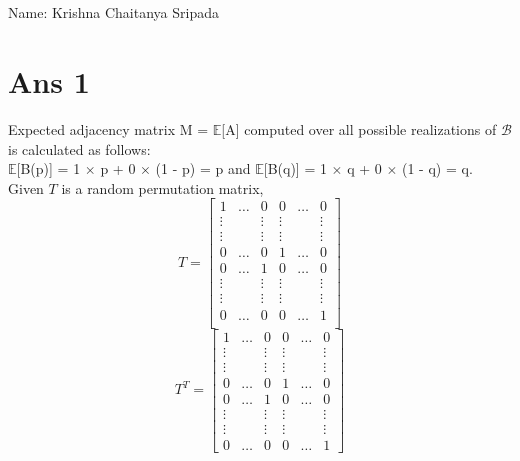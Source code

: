\documentclass[10pt]{article}
\begin{document}
\section*{}
\begin{flushleft}
Name: Krishna Chaitanya Sripada\\
\end{flushleft}
\section*{Ans 1}
\begin{flushleft}
Expected adjacency matrix M = $\mathbb{E}$[A] computed over all possible realizations of $\mathcal{B}$ is calculated as follows:\\
\vspace{0.5em}
$\mathbb{E}$[B(p)] = 1 $\times$ p + 0 $\times$ (1 - p) = p and $\mathbb{E}$[B(q)] = 1 $\times$ q + 0 $\times$ (1 - q) = q.\\
\vspace{0.5em}
Given $T$ is a random permutation matrix,\\
\vspace{0.5em}
$$ T = 
\begin{bmatrix} 
1 & \hdots & 0 & 0 & \hdots & 0\\
\vdots & & \vdots & \vdots & & \vdots\\
\vdots & & \vdots & \vdots & & \vdots\\
0 & \hdots & 0 & 1 & \hdots & 0\\
0 & \hdots & 1 & 0 & \hdots & 0\\ 
\vdots & & \vdots & \vdots & & \vdots\\
\vdots & & \vdots & \vdots & & \vdots\\
0 & \hdots & 0 & 0 & \hdots & 1\\
\end{bmatrix}
$$
\vspace{0.5em}
$$ T^{T} = 
\begin{bmatrix} 
1 & \hdots & 0 & 0 & \hdots & 0\\
\vdots & & \vdots & \vdots & & \vdots\\
\vdots & & \vdots & \vdots & & \vdots\\
0 & \hdots & 0 & 1 & \hdots & 0\\
0 & \hdots & 1 & 0 & \hdots & 0\\ 
\vdots & & \vdots & \vdots & & \vdots\\
\vdots & & \vdots & \vdots & & \vdots\\
0 & \hdots & 0 & 0 & \hdots & 1

\end{bmatrix}$$
\end{flushleft}
\end{document}
